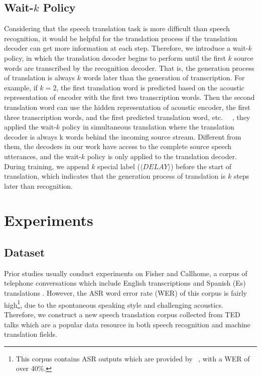 \documentclass[letterpaper]{article} %
\begin{document}
\subsection{Wait-$k$ Policy} 
Considering that the speech translation task is more difficult than speech recognition, it would be helpful for the translation process if the translation decoder can get more information at each step. 
Therefore, we introduce a wait-$k$ policy, in which the translation decoder begins to perform until the first $k$ source words are transcribed by the recognition decoder. That is, the generation process of translation is always $k$ words later than the generation of transcription. For example, if $k=2$, the first translation word is predicted based on the acoustic representation of encoder with the first two transcription words. Then the second translation word can use the hidden representation of acoustic encoder, the first three transcription words, and the first predicted translation word, etc.
~\citeauthor{ma2018stacl}~, they applied the wait-$k$ policy in simultaneous translation where the translation decoder is always k words behind the incoming source stream. Different from them, the decoders in our work have access to the complete source speech utterances, and the wait-$k$ policy is only applied to the translation decoder. During training, we append $k$ special label ($\langle DELAY\rangle$) before the start of translation, which indicates that the generation process of translation is $k$ steps later than recognition. 

\section{Experiments}
\subsection{Dataset}
Prior studies usually conduct experiments on Fisher and Callhome, a corpus of telephone conversations which include English transcriptions and Spanish (Es) translations \cite{post2013improved}. However, the ASR word error rate (WER) of this corpus is fairly high\footnote{This corpus contains ASR outputs which are provided by \citeauthor{post2013improved}~, with a WER of over 40\%.}, due to the spontaneous speaking style and challenging acoustics. %
Therefore, we construct a new speech translation corpus collected from TED talks which are a popular data resource in both speech recognition and machine translation fields.
\end{document}
